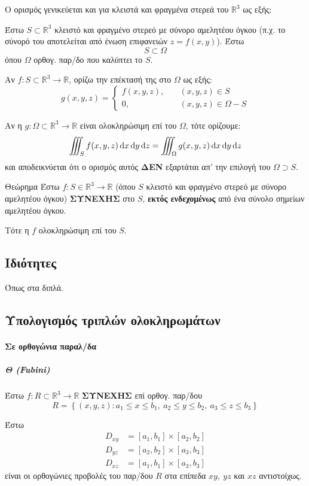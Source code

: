 \documentclass[11pt,a4paper,titlepage]{article}
\newcommand{\textlatin}[1]{#1}
\begin{document}
Ο ορισμός γενικεύεται και για κλειστά και φραγμένα στερεά του \( \mathbb R ^3\) ως εξής:

Έστω \(S \subset  \mathbb R ^3 \) κλειστό και φραγμένο στερεό με σύνορο αμελητέου όγκου (π.χ. το σύνορό του αποτελείται από ένωση επιφανειών \(z=f(x,y)\)). Έστω
\[
S \subset \Omega
\]
όπου \(\Omega\) ορθογ. παρ/δο που καλύπτει το \(S\).

Αν $f:S \subset \mathbb R^3 \to  \mathbb R $, ορίζω την επέκτασή της στο \(\Omega\) ως εξής:
\[
g(x,y,z) = \begin{cases}
f(x,y,z),\quad&(x,y,z)\in S\\
0,\quad&(x,y,z)\in \Omega-S
\end{cases}
\]

Αν η \(g:\Omega \subset  \mathbb R ^3\to \mathbb R \) είναι ολοκληρώσιμη επί του \(\Omega\), τότε ορίζουμε:
\[
\iiint_S f(x,y,z)\dif x\dif y\dif z=
\iiint_\Omega g(x,y,z)\dif x\dif y \dif z
\]
και αποδεικνύεται ότι ο ορισμός αυτός \textbf{ΔΕΝ} εξαρτάται απ' την επιλογή του \(\Omega \supset S\).

\begin{attnbox}{Θεώρημα}
Έστω \(f:S\in  \mathbb R ^3\to  \mathbb R \) (όπου $S$ κλειστό και φραγμένο στερεό με σύνορο αμελητέου όγκου) \textbf{ΣΥΝΕΧΗΣ} στο \(S\), \textbf{εκτός ενδεχομένως} από ένα σύνολο σημείων αμελητέου όγκου.

Τότε η \(f\) ολοκληρώσιμη επί του \(S\).
\end{attnbox}

\subsection{Ιδιότητες}
Όπως στα διπλά.

\subsection{Υπολογισμός τριπλών ολοκληρωμάτων}
\paragraph{ Σε ορθογώνια παραλ/δα}
\subparagraph{Θ (\textlatin{Fubini})} Έστω \(f:R \subset  \mathbb R ^3\to  \mathbb R \) \textbf{ΣΥΝΕΧΗΣ} επί ορθογ. παρ/δου
\[
R =  \left\lbrace (x,y,z): a_1\leq x\leq b_1,\ a_2\leq y\leq b_2,\ a_3\leq z\leq b_3  \right\rbrace
\]

Έστω \begin{align*}
D_{xy} &= [a_1,b_1]\times[a_2,b_2]\\
D_{yz} &= [a_2,b_2]\times[a_3,b_3]\\
D_{xz} &= [a_1,b_1]\times[a_3,b_3]
\end{align*}
είναι οι ορθογώνιες προβολές του παρ/δου \(R\) στα επίπεδα \(xy,\ yz\) και \(xz\) αντιστοίχως.
\end{document}
